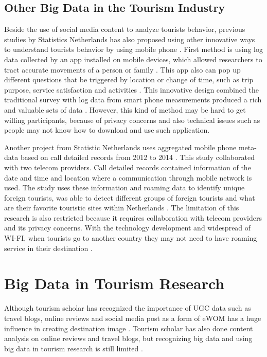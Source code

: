 \documentclass[sigconf]{acmart}
\begin{document}
\subsection{Other Big Data in the Tourism Industry}
Beside the use of social media content to analyze tourists behavior, previous studies
by Statistics Netherlands has also proposed using other innovative ways to understand
tourists behavior by using mobile phone \cite{heerschap2014innovation}. First method
is using log data collected by an app installed on mobile devices, which allowed
researchers to tract accurate movements of a person or family 
\cite{heerschap2014innovation}. This app also can pop up different questions that be
triggered by location or change of time, such as trip purpose, service satisfaction and
activities \cite{heerschap2014innovation}. This innovative design combined
the traditional survey with log data from smart phone measurements produced a rich and
valuable sets of data \cite{heerschap2014innovation}. However, this kind of method may
be hard to get willing participants, because of privacy concerns and also technical
issues such as people may not know how to download and use such application.

Another project from Statistic Netherlands uses aggregated mobile phone meta-data
based on call detailed records from 2012 to 2014 \cite{heerschap2014innovation}. 
This study collaborated with two telecom providers. Call detailed records contained
information of the date and time and location where a communication through mobile
network is used. The study uses these information and roaming data to identify unique
foreign tourists, was able to detect different groups of foreign tourists and 
what are their favorite touristic sites within Netherlands \cite{heerschap2014innovation}.
The limitation of this research is also restricted because it requires collaboration 
with telecom providers and its privacy concerns. With the technology development and
widespread of WI-FI, when tourists go to another country they may not need to have
roaming service in their destination \cite{heerschap2014innovation}.   

\section{Big Data in Tourism Research}
Although tourism scholar has recognized the importance of UGC data such as travel
blogs, online reviews and social media post as a form of eWOM has a huge influence in
creating destination image \cite{XIANG2015120,chung2009}. Tourism scholar has also done
content analysis on online reviews and travel blogs, but recognizing big data and using 
big data in tourism research is still limited \cite{Williams201787,chung2009}. 
\end{document}
